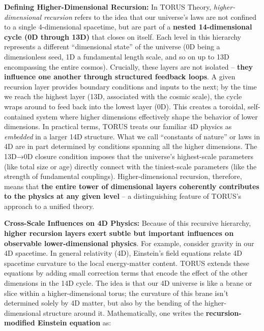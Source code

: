 \documentclass[]{article}
\begin{document}
\textbf{Defining Higher-Dimensional Recursion:} In TORUS Theory,
\emph{higher-dimensional recursion} refers to the idea that our
universe's laws are not confined to a single 4-dimensional spacetime,
but are part of a \textbf{nested 14-dimensional cycle (0D through 13D)}
that closes on itself. Each level in this hierarchy represents a
different ``dimensional state'' of the universe (0D being a
dimensionless seed, 1D a fundamental length scale, and so on up to 13D
encompassing the entire cosmos). Crucially, these layers are not
isolated -- \textbf{they influence one another through structured
feedback loops}. A given recursion layer provides boundary conditions
and inputs to the next; by the time we reach the highest layer (13D,
associated with the cosmic scale), the cycle wraps around to feed back
into the lowest layer (0D). This creates a toroidal, self-contained
system where higher dimensions effectively shape the behavior of lower
dimensions. In practical terms, TORUS treats our familiar 4D physics as
\emph{embedded} in a larger 14D structure. What we call ``constants of
nature'' or laws in 4D are in part determined by conditions spanning all
the higher dimensions​. The 13D→0D closure condition imposes that the
universe's highest-scale parameters (like total size or age) directly
connect with the tiniest-scale parameters (like the strength of
fundamental couplings). Higher-dimensional recursion, therefore, means
that \textbf{the entire tower of dimensional layers coherently
contributes to the physics at any given level} -- a distinguishing
feature of TORUS's approach to a unified theory.

\textbf{Cross-Scale Influences on 4D Physics:} Because of this recursive
hierarchy, \textbf{higher recursion layers exert subtle but important
influences on observable lower-dimensional physics}. For example,
consider gravity in our 4D spacetime. In general relativity (4D),
Einstein's field equations relate 4D spacetime curvature to the local
energy-matter content. TORUS extends these equations by adding small
correction terms that encode the effect of the other dimensions in the
14D cycle. The idea is that our 4D universe is like a brane or slice
within a higher-dimensional torus; the curvature of this brane isn't
determined solely by 4D matter, but also by the bending of the
higher-dimensional structure around it. Mathematically, one writes the
\textbf{recursion-modified Einstein equation} as:
\end{document}
